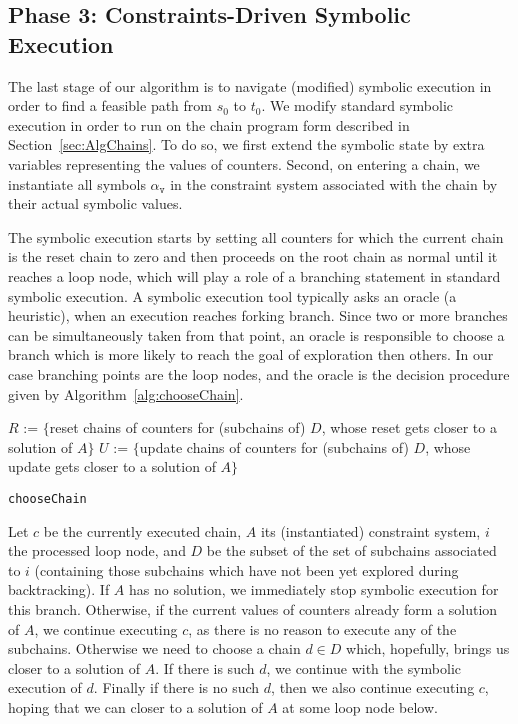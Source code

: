 \documentclass{llncs}
\begin{document}
\subsection{Phase 3: Constraints-Driven Symbolic Execution}
\label{sec:AlgSolving}

The last stage of our algorithm is to navigate (modified) symbolic execution
in order to find a feasible path from $s_0$ to $t_0$. We
modify standard symbolic execution in order to run on the chain program form
described in Section~\ref{sec:AlgChains}. To do so, we first extend the
symbolic state by extra variables representing the values of
counters. Second, on entering a chain, we instantiate all symbols $\alpha_\mathtt{v}$ in the
constraint system associated with the chain by their
actual symbolic values.

The symbolic execution starts by setting all counters for which the current
chain is the reset chain to zero and then proceeds on the root chain as
normal until it reaches a loop node, which will play a role of a branching
statement in standard symbolic execution.  A symbolic execution tool
typically asks an oracle (a heuristic), when an execution reaches forking
branch. Since two or more branches can be simultaneously taken from that
point, an oracle is responsible to choose a branch which is more likely to
reach the goal of exploration then others. In our case branching points are
the loop nodes, and the oracle is the decision
procedure given by Algorithm~\ref{alg:chooseChain}.

\begin{algorithm}
\dontprintsemicolon
{}
$R$ := $\{$reset chains of counters for (subchains of) $D$, whose reset gets closer to a solution of $A\}$\;
$U$ := $\{$update chains of counters for (subchains of) $D$, whose update gets closer to a solution of $A\}$\;
\;
\BlankLine
\caption{\texttt{chooseChain}}
\label{alg:chooseChain}
\end{algorithm}

Let $c$ be the currently executed chain, $A$ its (instantiated) constraint
system, $i$ the processed loop node, and $D$ be the
subset of the set of subchains associated to $i$ (containing those subchains
which have not been yet explored during backtracking). If $A$ has no
solution, we immediately stop symbolic execution for this branch. Otherwise,
if the current values of counters already form a solution of $A$, we continue executing
$c$, as there is no reason to execute any of the subchains. Otherwise we need to choose a chain
$d\in D$ which, hopefully, brings us closer to a solution of $A$. If there
is such $d$, we continue with the symbolic execution of $d$. Finally if there
is no such $d$, then we also continue executing $c$, hoping that we can closer to
a solution of $A$ at some loop node below.
\end{document}
